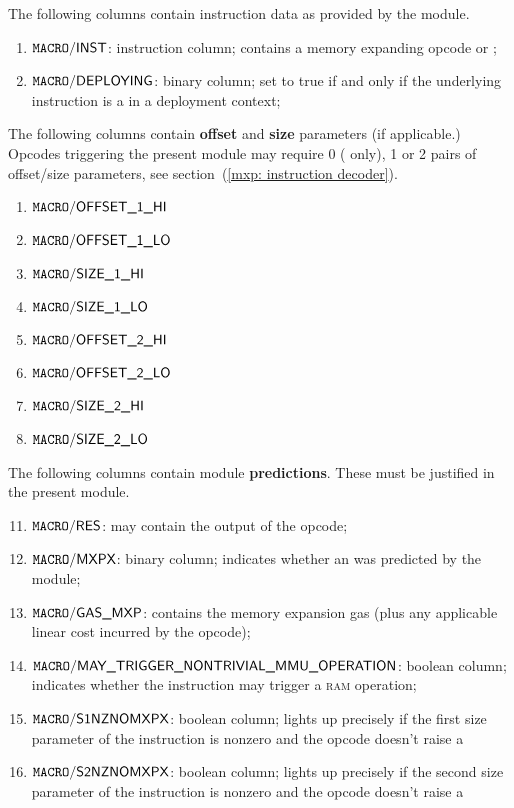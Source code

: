 The following columns contain instruction data as provided by the \hubMod{} module.
\begin{enumerate}
	\item
		$\texttt{MACRO}\textsf{/}{\textsf{INST}}$:
		instruction column;
		contains a memory expanding opcode or ;
	\item
		$\texttt{MACRO}\textsf{/}{\textsf{DEPLOYING}}$:
		binary column;
		set to true if and only if the underlying instruction is a  in a deployment context;
\end{enumerate}
The following columns contain \textbf{offset} and \textbf{size} parameters (if applicable.)
Opcodes triggering the present module may require 0 ( only), 1 or 2 pairs of offset/size parameters,
see section~(\ref{mxp: instruction decoder}).
\begin{multicols}{2}
	\begin{enumerate}[resume]
		\item
			$\texttt{MACRO}\textsf{/}{\textsf{OFFSET\_1\_HI}}$
		\item
			$\texttt{MACRO}\textsf{/}{\textsf{OFFSET\_1\_LO}}$
		\item
			$\texttt{MACRO}\textsf{/}{\textsf{SIZE\_1\_HI}}$
		\item
			$\texttt{MACRO}\textsf{/}{\textsf{SIZE\_1\_LO}}$
		\item
			$\texttt{MACRO}\textsf{/}{\textsf{OFFSET\_2\_HI}}$
		\item
			$\texttt{MACRO}\textsf{/}{\textsf{OFFSET\_2\_LO}}$
		\item
			$\texttt{MACRO}\textsf{/}{\textsf{SIZE\_2\_HI}}$
		\item
			$\texttt{MACRO}\textsf{/}{\textsf{SIZE\_2\_LO}}$
	\end{enumerate}
\end{multicols}
The following columns contain \hubMod{} module \textbf{predictions}.
These must be justified in the present module.
\begin{enumerate}[resume] \setcounter{enumi}{10}
	\item
		$\texttt{MACRO}\textsf{/}{\textsf{RES}}$:
		may contain the output of the  opcode;
	\item
		$\texttt{MACRO}\textsf{/}{\textsf{MXPX}}$:
		binary column;
		indicates whether an \mxpxSH{} was predicted by the \hubMod{} module;
	\item
		$\texttt{MACRO}\textsf{/}{\textsf{GAS\_MXP}}$:
		contains the memory expansion gas (plus any applicable linear cost incurred by the opcode);
	\item
		$\texttt{MACRO}\textsf{/}{\textsf{MAY\_TRIGGER\_NONTRIVIAL\_MMU\_OPERATION}}$:
		boolean column;
		indicates whether the instruction may trigger a \textsc{ram} operation;
	\item
		$\texttt{MACRO}\textsf{/}{\textsf{S1NZNOMXPX}}$:
		boolean column;
		lights up precisely if the first size parameter of the instruction is nonzero and the opcode doesn't raise a \mxpxSH{}
	\item
		$\texttt{MACRO}\textsf{/}{\textsf{S2NZNOMXPX}}$:
		boolean column;
		lights up precisely if the second size parameter of the instruction is nonzero and the opcode doesn't raise a \mxpxSH{}
\end{enumerate}
